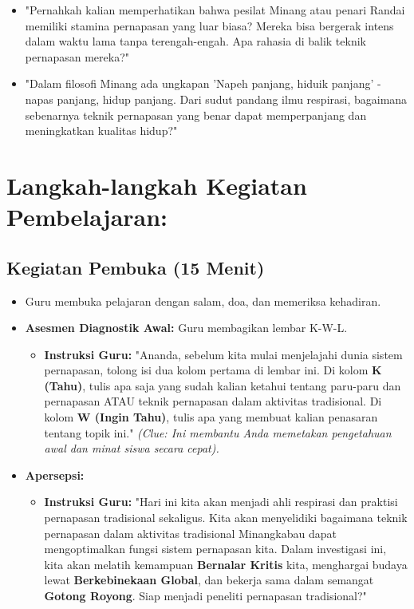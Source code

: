 \documentclass[a4paper,12pt]{article}
\begin{document}
\begin{itemize}
\item "Pernahkah kalian memperhatikan bahwa pesilat Minang atau penari Randai memiliki stamina pernapasan yang luar biasa? Mereka bisa bergerak intens dalam waktu lama tanpa terengah-engah. Apa rahasia di balik teknik pernapasan mereka?"
\item "Dalam filosofi Minang ada ungkapan 'Napeh panjang, hiduik panjang' - napas panjang, hidup panjang. Dari sudut pandang ilmu respirasi, bagaimana sebenarnya teknik pernapasan yang benar dapat memperpanjang dan meningkatkan kualitas hidup?"
\end{itemize}

\section{Langkah-langkah Kegiatan Pembelajaran:}

\subsection{Kegiatan Pembuka (15 Menit)}
\begin{itemize}
\item Guru membuka pelajaran dengan salam, doa, dan memeriksa kehadiran.
\item \textbf{Asesmen Diagnostik Awal:} Guru membagikan lembar K-W-L.
    \begin{itemize}
    \item \textbf{Instruksi Guru:} "Ananda, sebelum kita mulai menjelajahi dunia sistem pernapasan, tolong isi dua kolom pertama di lembar ini. Di kolom \textbf{K (Tahu)}, tulis apa saja yang sudah kalian ketahui tentang paru-paru dan pernapasan ATAU teknik pernapasan dalam aktivitas tradisional. Di kolom \textbf{W (Ingin Tahu)}, tulis apa yang membuat kalian penasaran tentang topik ini." \textit{(Clue: Ini membantu Anda memetakan pengetahuan awal dan minat siswa secara cepat).}
    \end{itemize}
\item \textbf{Apersepsi:}
    \begin{itemize}
    \item \textbf{Instruksi Guru:} "Hari ini kita akan menjadi ahli respirasi dan praktisi pernapasan tradisional sekaligus. Kita akan menyelidiki bagaimana teknik pernapasan dalam aktivitas tradisional Minangkabau dapat mengoptimalkan fungsi sistem pernapasan kita. Dalam investigasi ini, kita akan melatih kemampuan \textbf{Bernalar Kritis} kita, menghargai budaya lewat \textbf{Berkebinekaan Global}, dan bekerja sama dalam semangat \textbf{Gotong Royong}. Siap menjadi peneliti pernapasan tradisional?"
    \end{itemize}
\end{itemize}
\end{document}
